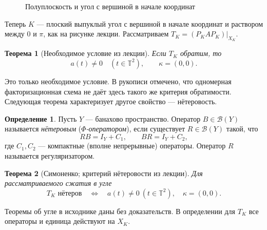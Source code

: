 \documentclass[12pt,a4paper]{article}
\newtheorem{theorem}{Теорема}
\theoremstyle{definition}
\newtheorem{definition}{Определение}
\theoremstyle{remark}
\newcommand{\TT}{\mathbb T}
\newcommand{\BB}{\mathcal B}
\begin{document}
\begin{figure}[ht]
\centering
{}
\caption{Полуплоскость и угол с вершиной в начале координат}
\end{figure}

Теперь $K$ --- плоский выпуклый угол с вершиной в начале
координат и раствором между $0$ и $\pi$, как на рисунке лекции.
Рассматриваем $T_K=(P_KAP_K)|_{X_K}$.

\begin{theorem}[Необходимое условие из лекции]
Если $T_K$ обратим, то
\[
  a(t)\ne0\quad(t\in\TT^2),\qquad\kappa=(0,0).
\]
\end{theorem}

Это только необходимое условие. В рукописи отмечено, что
одномерная факторизационная схема не даёт здесь такого же
критерия обратимости. Следующая теорема характеризует другое
свойство --- нётеровость.

\begin{definition}
Пусть $Y$ --- банахово пространство. Оператор $B\in\BB(Y)$
называется \emph{нётеровым} (\emph{$\Phi$-оператором}), если
существует $R\in\BB(Y)$ такой, что
\[
  RB=I_Y+C_1,\qquad BR=I_Y+C_2,
\]
где $C_1,C_2$ --- компактные (вполне непрерывные) операторы.
Оператор $R$ называется регуляризатором.
\end{definition}

\begin{theorem}[Симоненко; критерий нётеровости из лекции]
Для рассматриваемого сжатия в угле
\[
  \boxed{T_K\text{ нётеров}\quad\Longleftrightarrow\quad
  a(t)\ne0\ (t\in\TT^2),\quad\kappa=(0,0)}.
\]
\end{theorem}

Теоремы об угле в исходнике даны без доказательств.
В определении для $T_K$ все операторы и единица действуют на $X_K$.
\end{document}
